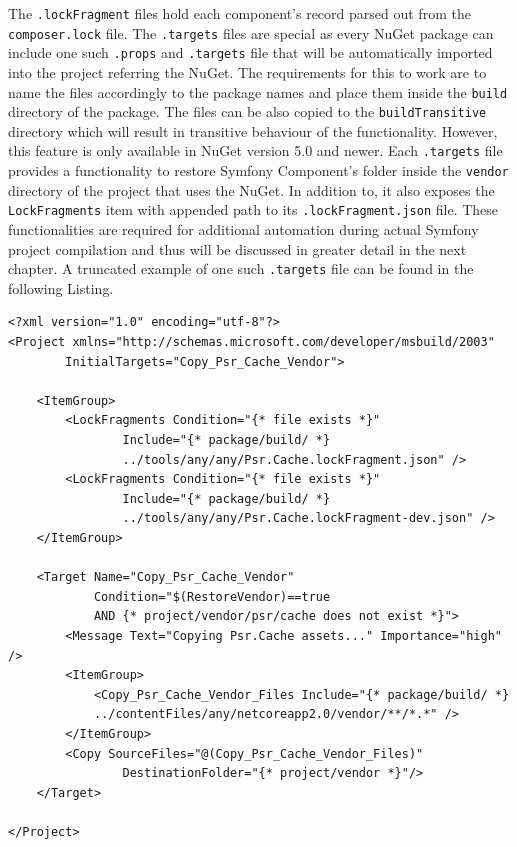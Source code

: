 The \texttt{.lockFragment} files hold each component's record parsed out from the \texttt{composer.lock} file. The \texttt{.targets} files are special as every NuGet package can include one such \texttt{.props} and \texttt{.targets} file that will be automatically imported into the project referring the NuGet. The requirements for this to work are to name the files accordingly to the package names and place them inside the \texttt{build} directory of the package. The files can be also copied to the \texttt{buildTransitive} directory which will result in transitive behaviour of the functionality. However, this feature is only available in NuGet version 5.0 and newer. Each \texttt{.targets} file provides a functionality to restore Symfony Component's folder inside the \texttt{vendor} directory of the project that uses the NuGet. In addition to, it also exposes the \texttt{LockFragments} item with appended path to its \texttt{.lockFragment.json} file. These functionalities are required for additional automation during actual Symfony project compilation and thus will be discussed in greater detail in the next chapter. A truncated example of one such \texttt{.targets} file can be found in the following Listing.

\begin{center}
\begin{lstlisting}[caption={Psr.Cache.targets},captionpos=b]
<?xml version="1.0" encoding="utf-8"?>
<Project xmlns="http://schemas.microsoft.com/developer/msbuild/2003" 
		InitialTargets="Copy_Psr_Cache_Vendor">
    
    <ItemGroup>
        <LockFragments Condition="{* file exists *}"
        		Include="{* package/build/ *}
        		../tools/any/any/Psr.Cache.lockFragment.json" />
        <LockFragments Condition="{* file exists *}"
        		Include="{* package/build/ *}
        		../tools/any/any/Psr.Cache.lockFragment-dev.json" />
    </ItemGroup>

    <Target Name="Copy_Psr_Cache_Vendor" 
    		Condition="$(RestoreVendor)==true 
 			AND {* project/vendor/psr/cache does not exist *}">
        <Message Text="Copying Psr.Cache assets..." Importance="high" />
        <ItemGroup>
            <Copy_Psr_Cache_Vendor_Files Include="{* package/build/ *}
            ../contentFiles/any/netcoreapp2.0/vendor/**/*.*" />
        </ItemGroup>
        <Copy SourceFiles="@(Copy_Psr_Cache_Vendor_Files)" 
        		DestinationFolder="{* project/vendor *}"/>
    </Target>

</Project>
\end{lstlisting}
\end{center}

